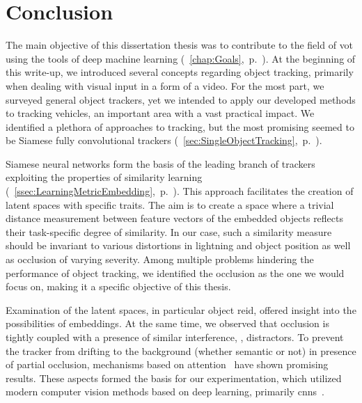 \chapter{Conclusion}
\label{chap:Conclusion}

The main objective of this dissertation thesis was to contribute to the field of \gls{vot} using the tools of deep machine learning (\chaptertext{}~\ref{chap:Goals},~p.~\pageref{chap:Goals}). At the beginning of this write-up, we introduced several concepts regarding object tracking, primarily when dealing with visual input in a form of a video. For the most part, we surveyed general object trackers, yet we intended to apply our developed methods to tracking vehicles, an important area with a vast practical impact. We identified a plethora of approaches to tracking, but the most promising seemed to be Siamese fully convolutional trackers (\sectiontext{}~\ref{sec:SingleObjectTracking},~p.~\pageref{sec:SingleObjectTracking}).

Siamese neural networks form the basis of the leading branch of trackers exploiting the properties of similarity learning (\sectiontext{}~\ref{ssec:LearningMetricEmbedding},~p.~\pageref{ssec:LearningMetricEmbedding}). This approach facilitates the creation of latent spaces with specific traits. The aim is to create a space where a trivial distance measurement between feature vectors of the embedded objects reflects their task-specific degree of similarity. In our case, such a similarity measure should be invariant to various distortions in lightning and object position as well as occlusion of varying severity. Among multiple problems hindering the performance of object tracking, we identified the occlusion as the one we would focus on, making it a specific objective of this thesis.

Examination of the latent spaces, in particular object \gls{reid}, offered insight into the possibilities of embeddings. At the same time, we observed that occlusion is tightly coupled with a presence of similar interference, \ietext{}, distractors. To prevent the tracker from drifting to the background (whether semantic or not) in presence of partial occlusion, mechanisms based on attention~\cite{vaswani2017attention} have shown promising results. These aspects formed the basis for our experimentation, which utilized modern computer vision methods based on deep learning, primarily \glspl{cnn}~\cite{krizhevsky2012classification}.

